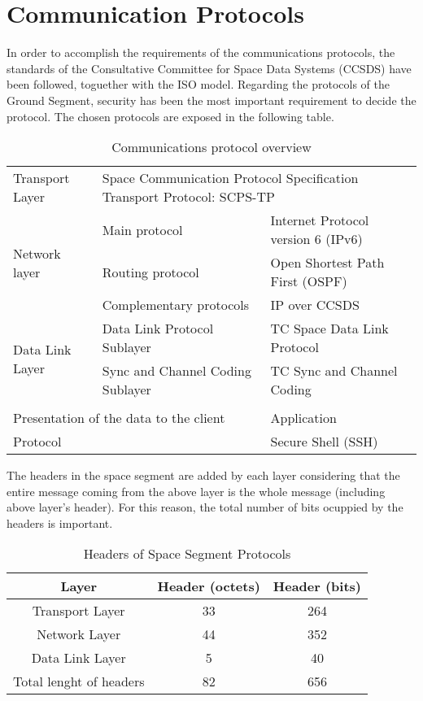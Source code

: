 \section{Communication Protocols}
In order to accomplish the requirements of the communications protocols, the standards of the Consultative Committee for Space Data Systems (CCSDS) have been followed, toguether with the ISO model. Regarding the protocols of the Ground Segment, security has been the most important requirement to decide the protocol. The chosen protocols are exposed in the following table.
\begin{table}[H]
\begin{center}
\begin{tabular}{|l|l|l|}
\hline
\rowcolor[gray]{0.80} \multicolumn{3}{|c|}{\textbf{Space segment: CCSDS Standards}}\\
\hline
Transport Layer&\multicolumn{2}{|l|}{Space Communication Protocol Specification Transport Protocol: SCPS-TP}\\
\hline
\multirow{3}{*}{Network layer}&Main protocol&Internet Protocol version 6 (IPv6)\\
&Routing protocol&Open Shortest Path First (OSPF)\\
&Complementary protocols&IP over CCSDS\\
\hline
\multirow{2}{*}{Data Link Layer}&Data Link Protocol Sublayer&TC Space Data Link Protocol\\
&Sync and Channel Coding Sublayer&TC Sync and Channel Coding\\
\hline
\rowcolor[gray]{0.80} \multicolumn{3}{|c|}{\textbf{Ground segment}}\\
\hline
\multicolumn{2}{|l|}{Presentation of the data to the client}&Application\\
\hline
\multicolumn{2}{|l|}{Protocol}&Secure Shell (SSH)\\
\hline
\end{tabular}
\caption{Communications protocol overview}
\end{center}
\end{table}
The headers in the space segment are added by each layer considering that the entire message coming from the above layer is the whole message (including above layer's header). For this reason, the total number of bits ocuppied by the headers is important. 
\begin{table}[H]
\begin{center}
\begin{tabular}{|c|c|c|}
\hline
\rowcolor[gray]{0.80}\textbf{Layer}&\textbf{Header (octets)}&\textbf{Header (bits)}\\
\hline
Transport Layer&33&264\\
\hline
Network Layer&44&352\\
\hline
Data Link Layer&5&40\\
\hline
\cellcolor[gray]{0.85}Total lenght of headers&82&656\\
\hline
\end{tabular}
\caption{Headers of Space Segment Protocols}
\end{center}
\end{table}
